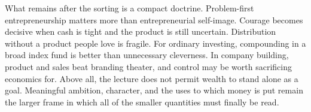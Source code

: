 What remains after the sorting is a compact doctrine. Problem-first entrepreneurship matters more than entrepreneurial self-image. Courage becomes decisive when cash is tight and the product is still uncertain. Distribution without a product people love is fragile. For ordinary investing, compounding in a broad index fund is better than unnecessary cleverness. In company building, product and sales beat branding theater, and control may be worth sacrificing economics for. Above all, the lecture does not permit wealth to stand alone as a goal. Meaningful ambition, character, and the uses to which money is put remain the larger frame in which all of the smaller quantities must finally be read.